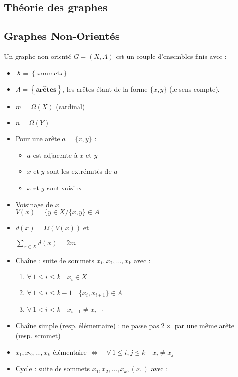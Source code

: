 \documentclass[a4paper, 8pt]{article}
\begin{document}
\begin{multicols*}{3}
\section*{Théorie des graphes}

\subsection*{Graphes Non-Orientés}
Un graphe non-orienté $G = (X,A)$ est un couple d'ensembles finis avec :
\begin{itemize}
\item $X = \left\{\text{sommets}\right\}$
\item $A = \left\{\mathbf{ar\hat{e}tes}\right\}$, les arêtes étant de la forme $\{x,y\}$ (le sens compte).
\item $m = \Omega(X)$ (cardinal)
\item $n = \Omega(Y)$
\item Pour une arête $a = \{x,y\}$ :
	\begin{itemize}
	\item $a$ est adjacente à $x$ et $y$
	\item $x$ et $y$ sont les extrémités de $a$
	\item $x$ et $y$ sont voisins
	\end{itemize}
\item Voisinage de $x$\\ $V(x) = \{y \in X / \{x,y\} \in A$
\item $d(x) = \Omega(V(x))$ et \begin{flushright}
$\sum_{x\in X}{d(x)} = 2m$
\end{flushright}
\item Chaîne : suite de sommets $x_1,x_2,\hdots,x_k$ avec :
\begin{enumerate}
\item $\forall \, 1\leqslant i \leqslant k \quad  x_i \in X$
\item $\forall \, 1\leqslant i \leqslant k-1 \quad \{x_i,x_{i+1}\} \in A$
\item $\forall \, 1< i< k \quad x_{i-1} \neq x_{i+1}$
\end{enumerate}
\item Chaîne simple (resp. élémentaire) : ne passe pas $2\times$ par une même arête (resp. sommet)
\item $x_1,x_2,\hdots,x_k$ élémentaire $\Longleftrightarrow \quad \forall \, 1\leqslant i,j \leqslant k \quad  x_i \neq x_j$
\item Cycle : suite de sommets $x_1,x_2,\hdots,x_k,(x_1)$ avec :

\end{itemize}
\end{multicols*}
\end{document}

